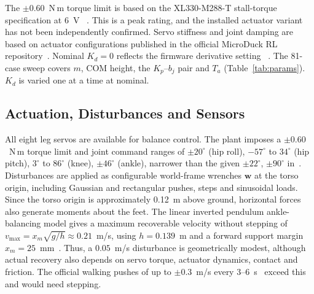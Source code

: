 \documentclass[conference,a4paper]{IEEEtran}
\begin{document}

The $\pm0.60$~N\,m torque limit is based on the XL330-M288-T stall-torque specification at 6~V ~\cite{robotis_xl330}. This is a peak rating, and the installed actuator variant has not been independently confirmed. Servo stiffness and joint damping are based on actuator configurations published in the official MicroDuck RL repository~\cite{microduck_rl_joints}. Nominal $K_d=0$ reflects the firmware derivative setting ~\cite{openmicroduck_params}. The 81-case sweep covers $m$, COM height, the $K_p$--$b_j$ pair and $T_a$ (Table~\ref{tab:params}). $K_d$ is varied one at a time at nominal.


\subsection{Actuation, Disturbances and Sensors}
All eight leg servos are available for balance control. The plant imposes a $\pm0.60$~N\,m torque limit and joint command ranges of $\pm20^\circ$ (hip roll), $-57^\circ$ to $34^\circ$ (hip pitch), $3^\circ$ to $86^\circ$ (knee), $\pm46^\circ$ (ankle), narrower than the given $\pm22^\circ$, $\pm90^\circ$ in~\cite{openmicroduck_params}.
Disturbances are applied as configurable world-frame wrenches $\mathbf{w}$ at the torso origin, including Gaussian and rectangular pushes, steps and sinusoidal loads. Since the torso origin is approximately 0.12~m above ground, horizontal forces also generate moments about the feet. The linear inverted pendulum ankle-balancing model gives a maximum recoverable velocity without stepping of $v_{\max}=x_m\sqrt{g/h}\approx 0.21$~m/s, using $h=0.139$~m and a forward support margin $x_m=25$~mm~\cite{stephens2007}. Thus, a $0.05$~m/s disturbance is geometrically modest, although actual recovery also depends on servo torque, actuator dynamics, contact and friction. The official walking pushes of up to $\pm0.3$~m/s every 3--6~s~\cite{openmicroduck_sim} exceed this and would need stepping.
\end{document}
